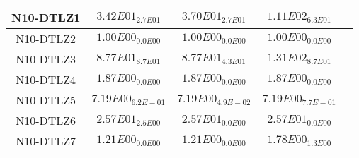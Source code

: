 \documentclass{article}
\begin{document}
\begin{table*}[ht!]
\begin{tabular}{|c||c||c||c||c|}
\hline
N10-DTLZ1 &\cellcolor{gray95}$3.42E01_{2.7E01}$ &\cellcolor{gray25}$3.70E01_{2.7E01}$ &$1.11E02_{6.3E01}$\\ 
\hline
N10-DTLZ2 &\cellcolor{gray95}$1.00E00_{0.0E00}$ &\cellcolor{gray25}$1.00E00_{0.0E00}$ &$1.00E00_{0.0E00}$\\ 
\hline
N10-DTLZ3 &\cellcolor{gray25}$8.77E01_{8.7E01}$ &\cellcolor{gray95}$8.77E01_{4.3E01}$ &$1.31E02_{8.7E01}$\\ 
\hline
N10-DTLZ4 &\cellcolor{gray95}$1.87E00_{0.0E00}$ &\cellcolor{gray25}$1.87E00_{0.0E00}$ &$1.87E00_{0.0E00}$\\ 
\hline
N10-DTLZ5 &\cellcolor{gray25}$7.19E00_{6.2E-01}$ &\cellcolor{gray95}$7.19E00_{4.9E-02}$ &$7.19E00_{7.7E-01}$\\ 
\hline
N10-DTLZ6 &$2.57E01_{2.5E00}$ &\cellcolor{gray95}$2.57E01_{0.0E00}$ &\cellcolor{gray25}$2.57E01_{0.0E00}$\\ 
\hline
N10-DTLZ7 &\cellcolor{gray95}$1.21E00_{0.0E00}$ &\cellcolor{gray25}$1.21E00_{0.0E00}$ &$1.78E00_{1.3E00}$\\ 
\hline
\end{tabular}
\end{table*}
\end{document}
